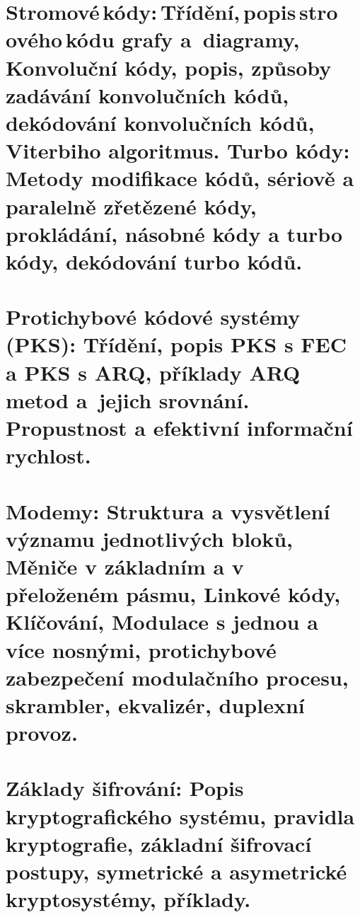 \newpage
\section{Stromové\,kódy:\,Třídění,\,popis\,stro\,ového\,kódu grafy a~diagramy, Konvoluční kódy, popis, způsoby zadávání konvolučních kódů, dekódování konvolučních kódů, Viterbiho algoritmus. Turbo kódy: Metody modifikace kódů, sériově a paralelně zřetězené kódy, prokládání, násobné kódy a turbo kódy, dekódování turbo kódů.}

\newpage
\section{Protichybové kódové systémy (PKS): Třídění, popis PKS s FEC a PKS s ARQ, příklady ARQ metod a~jejich srovnání. Propustnost a efektivní informační rychlost.}

\newpage
\section{Modemy: Struktura a vysvětlení významu jednotlivých bloků, Měniče v základním a v přeloženém pásmu, Linkové kódy, Klíčování, Modulace s jednou a více nosnými, protichybové zabezpečení modulačního procesu, skrambler, ekvalizér, duplexní provoz.}

\newpage
\section{Základy šifrování: Popis kryptografického systému, pravidla kryptografie, základní šifrovací postupy, symetrické a asymetrické kryptosystémy, příklady.}